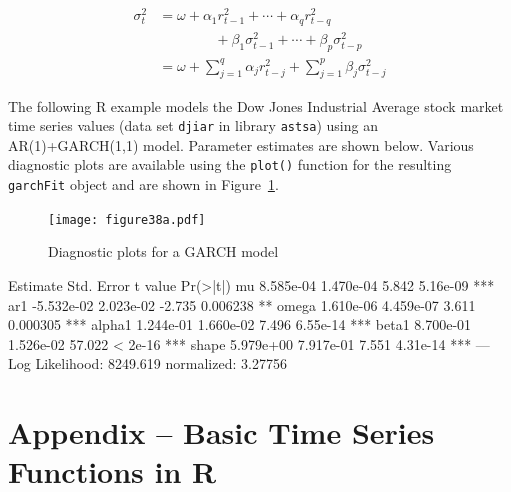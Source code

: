 \begin{align*}
\sigma_t^2 &= \omega + \alpha_1 r_{t-1}^2 + \cdots + \alpha_q r_{t-q}^2 \\
           & \qquad \qquad + \beta_1 \sigma_{t-1}^2 + \cdots + \beta_p \sigma_{t-p}^2 \\
           &= \omega + \sum_{j=1}^q \alpha_j r_{t-j}^2 + \sum_{j=1}^p \beta_j \sigma_{t-j}^2
\end{align*}

The following R example models the Dow Jones Industrial Average stock market time series values (data set \texttt{djiar} in library \texttt{astsa}) using an AR(1)+GARCH(1,1) model. Parameter estimates are shown below. Various diagnostic plots are available using the \texttt{plot()} function for the resulting \texttt{garchFit} object and are shown in Figure~\ref{fig:figure38a}. 


\begin{figure}
\centering
\texttt{[image: figure38a.pdf]}
\caption{Diagnostic plots for a GARCH model}
\label{fig:figure38a}
\end{figure}

\begin{textcode}
         Estimate  Std. Error  t value Pr(>|t|)    
mu      8.585e-04   1.470e-04    5.842 5.16e-09 ***
ar1    -5.532e-02   2.023e-02   -2.735 0.006238 ** 
omega   1.610e-06   4.459e-07    3.611 0.000305 ***
alpha1  1.244e-01   1.660e-02    7.496 6.55e-14 ***
beta1   8.700e-01   1.526e-02   57.022  < 2e-16 ***
shape   5.979e+00   7.917e-01    7.551 4.31e-14 ***
---
Log Likelihood:
 8249.619    normalized:  3.27756 
\end{textcode}

\section*{Appendix -- Basic Time Series Functions in R}

